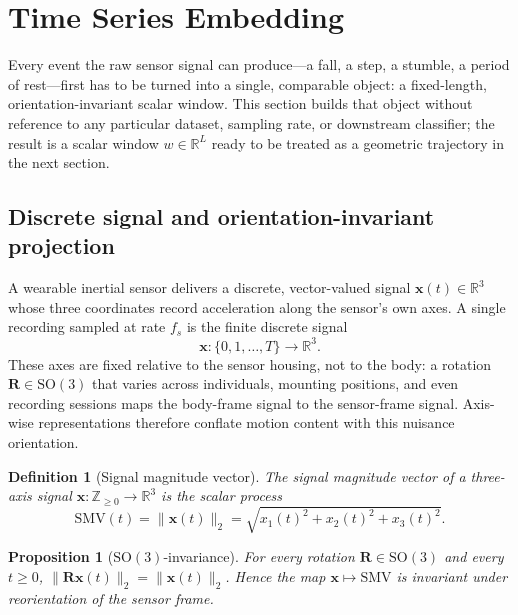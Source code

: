 \documentclass[onluarkali,ingilizce,yukseklisans,karton,LisansustuEgitim]{itutez}
\newtheorem{definition}{Definition}[chapter]
\newtheorem{proposition}{Proposition}[chapter]
\providecommand{\R}{\mathbb{R}}
\providecommand{\Z}{\mathbb{Z}}
\providecommand{\1}{\mathbf{1}}
\begin{document}
\section{Time Series Embedding}
\label{subsec:signal_rep}

Every event the raw sensor signal can produce---a fall, a step, a stumble, a period of rest---first has to be turned into a single, comparable object: a fixed-length, orientation-invariant scalar window. This section builds that object without reference to any particular dataset, sampling rate, or downstream classifier; the result is a scalar window $w\in\R^L$ ready to be treated as a geometric trajectory in the next section.

\subsection{Discrete signal and orientation-invariant projection}
\label{subsubsec:discrete-signal}

A wearable inertial sensor delivers a discrete, vector-valued signal $\mathbf{x}(t)\in\R^3$ whose three coordinates record acceleration along the sensor's own axes. A single recording sampled at rate $f_s$ is the finite discrete signal
\[
  \mathbf{x}\colon \{0,1,\ldots,T\}\longrightarrow\R^3.
\]
These axes are fixed relative to the sensor housing, not to the body: a rotation $\mathbf{R}\in\mathrm{SO}(3)$ that varies across individuals, mounting positions, and even recording sessions maps the body-frame signal to the sensor-frame signal. Axis-wise representations therefore conflate motion content with this nuisance orientation.

\begin{definition}[Signal magnitude vector]
\label{def:smv}
The \emph{signal magnitude vector} of a three-axis signal $\mathbf{x}\colon\Z_{\geq 0}\to\R^3$ is the scalar process
\begin{equation}
  \mathrm{SMV}(t)=\|\mathbf{x}(t)\|_2=\sqrt{x_1(t)^2+x_2(t)^2+x_3(t)^2}.
  \label{eq:smv}
\end{equation}
\end{definition}

\begin{proposition}[$\mathrm{SO}(3)$-invariance]
\label{prop:smv-invariance}
For every rotation $\mathbf{R}\in\mathrm{SO}(3)$ and every $t\geq 0$, $\|\mathbf{R}\mathbf{x}(t)\|_2=\|\mathbf{x}(t)\|_2$. Hence the map $\mathbf{x}\mapsto\mathrm{SMV}$ is invariant under reorientation of the sensor frame.
\end{proposition}
\end{document}
